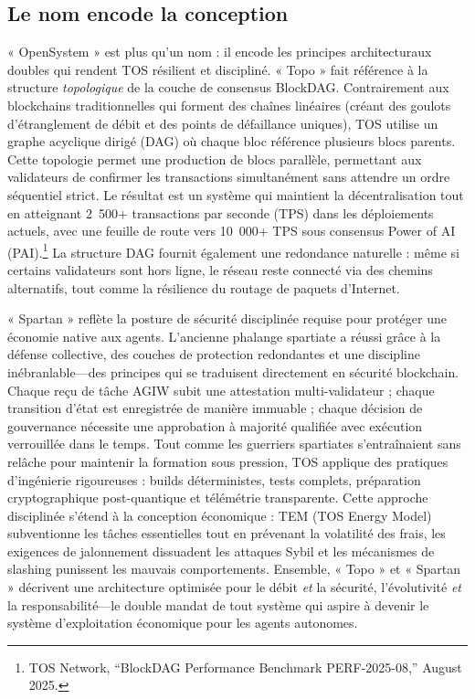 \documentclass[11pt]{article}
\begin{document}
\subsection{Le nom encode la conception}
« OpenSystem » est plus qu'un nom : il encode les principes architecturaux doubles qui rendent TOS résilient et discipliné. « Topo » fait référence à la structure \emph{topologique} de la couche de consensus BlockDAG. Contrairement aux blockchains traditionnelles qui forment des chaînes linéaires (créant des goulots d'étranglement de débit et des points de défaillance uniques), TOS utilise un graphe acyclique dirigé (DAG) où chaque bloc référence plusieurs blocs parents. Cette topologie permet une production de blocs parallèle, permettant aux validateurs de confirmer les transactions simultanément sans attendre un ordre séquentiel strict. Le résultat est un système qui maintient la décentralisation tout en atteignant 2~500+ transactions par seconde (TPS) dans les déploiements actuels, avec une feuille de route vers 10~000+ TPS sous consensus Power of AI (PAI).\footnote{TOS Network, ``BlockDAG Performance Benchmark PERF-2025-08,'' August 2025.} La structure DAG fournit également une redondance naturelle : même si certains validateurs sont hors ligne, le réseau reste connecté via des chemins alternatifs, tout comme la résilience du routage de paquets d'Internet.

« Spartan » reflète la posture de sécurité disciplinée requise pour protéger une économie native aux agents. L'ancienne phalange spartiate a réussi grâce à la défense collective, des couches de protection redondantes et une discipline inébranlable---des principes qui se traduisent directement en sécurité blockchain. Chaque reçu de tâche AGIW subit une attestation multi-validateur ; chaque transition d'état est enregistrée de manière immuable ; chaque décision de gouvernance nécessite une approbation à majorité qualifiée avec exécution verrouillée dans le temps. Tout comme les guerriers spartiates s'entraînaient sans relâche pour maintenir la formation sous pression, TOS applique des pratiques d'ingénierie rigoureuses : builds déterministes, tests complets, préparation cryptographique post-quantique et télémétrie transparente. Cette approche disciplinée s'étend à la conception économique : TEM (TOS Energy Model) subventionne les tâches essentielles tout en prévenant la volatilité des frais, les exigences de jalonnement dissuadent les attaques Sybil et les mécanismes de slashing punissent les mauvais comportements. Ensemble, « Topo » et « Spartan » décrivent une architecture optimisée pour le débit \emph{et} la sécurité, l'évolutivité \emph{et} la responsabilité---le double mandat de tout système qui aspire à devenir le système d'exploitation économique pour les agents autonomes.
\end{document}
